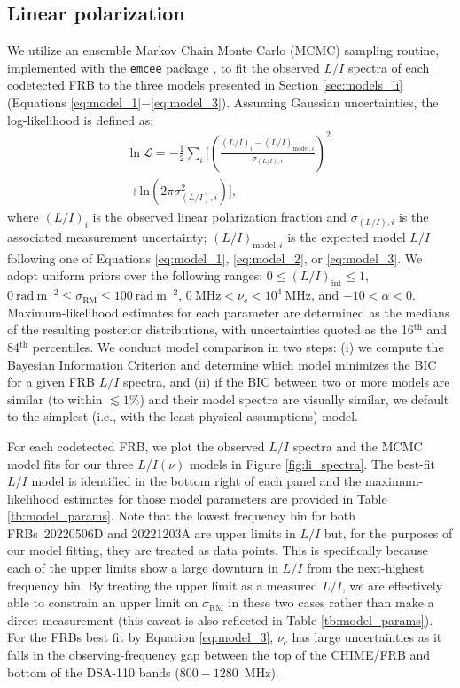 \documentclass[twocolumn, linenumbers]{aastex701}
\begin{document}
\subsection{Linear polarization} \label{sec:results_li}
We utilize an ensemble Markov Chain Monte Carlo (MCMC) sampling routine, implemented with the {\tt emcee} package \citep{2013PASP..125..306F}, to fit the observed $L/I$ spectra of each codetected FRB to the three models presented in Section \ref{sec:models_li} (Equations \ref{eq:model_1}$-$\ref{eq:model_3}). Assuming Gaussian uncertainties, the log-likelihood is defined as:
\begin{multline}
\mathrm{ln}~\mathcal{L} = -\frac{1}{2}\sum_i \bigg[ \left( \frac{(L/I)_i - (L/I)_{\mathrm{model,}i}}{\sigma_{(L/I),i}} \right)^2 \\
+ \mathrm{ln} \left(2 \pi \sigma_{(L/I),i}^2 \right) \bigg], \label{eq:log_likelihood}
\end{multline}
where $(L/I)_i$ is the observed linear polarization fraction and $\sigma_{(L/I),i}$ is the associated measurement uncertainty; $(L/I)_{\mathrm{model,}i}$ is the expected model $L/I$ following one of Equations \ref{eq:model_1}, \ref{eq:model_2}, or \ref{eq:model_3}. We adopt uniform priors over the following ranges: $0 \leq(L/I)_\mathrm{int} \leq 1$, $0~\mathrm{rad}~\mathrm{m}^{-2} \leq \sigma_\mathrm{RM} \leq 100~\mathrm{rad}~\mathrm{m}^{-2}$, $0~\mathrm{MHz} < \nu_c <10^4~\mathrm{MHz}$, and $-10 < \alpha < 0$. Maximum-likelihood estimates for each parameter are determined as the medians of the resulting posterior distributions, with uncertainties quoted as the 16$^\mathrm{th}$ and 84$^\mathrm{th}$ percentiles. We conduct model comparison in two steps: (i) we compute the Bayesian Information Criterion \citep[BIC;][]{1978AnSta...6..461S} and determine which model minimizes the BIC for a given FRB $L/I$ spectra, and (ii) if the BIC between two or more models are similar (to within $\lesssim 1\%$) and their model spectra are visually similar, we default to the simplest (i.e., with the least physical assumptions) model. 

For each codetected FRB, we plot the observed $L/I$ spectra and the MCMC model fits for our three $L/I(\nu)$ models in Figure \ref{fig:li_spectra}. The best-fit $L/I$ model is identified in the bottom right of each panel and the maximum-likelihood estimates for those model parameters are provided in Table \ref{tb:model_params}. Note that the lowest frequency bin for both FRBs~20220506D and 20221203A are upper limits in $L/I$ but, for the purposes of our model fitting, they are treated as data points. This is specifically because each of the upper limits show a large downturn in $L/I$ from the next-highest frequency bin. By treating the upper limit as a measured $L/I$, we are effectively able to constrain an upper limit on $\sigma_\mathrm{RM}$ in these two cases rather than make a direct measurement (this caveat is also reflected in Table \ref{tb:model_params}). For the FRBs best fit by Equation \ref{eq:model_3}, $\nu_c$ has large uncertainties as it falls in the observing-frequency gap between the top of the CHIME/FRB and bottom of the DSA-110 bands ($800-1280$~MHz).
\end{document}
